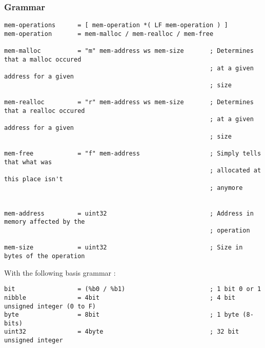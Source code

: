 \subsubsection{Grammar}
\begin{verbatim}
mem-operations      = [ mem-operation *( LF mem-operation ) ]
mem-operation       = mem-malloc / mem-realloc / mem-free

mem-malloc          = "m" mem-address ws mem-size       ; Determines that a malloc occured 
                                                        ; at a given address for a given 
                                                        ; size

mem-realloc         = "r" mem-address ws mem-size       ; Determines that a realloc occured
                                                        ; at a given address for a given 
                                                        ; size

mem-free            = "f" mem-address                   ; Simply tells that what was 
                                                        ; allocated at this place isn't 
                                                        ; anymore


mem-address         = uint32                            ; Address in memory affected by the
                                                        ; operation 

mem-size            = uint32                            ; Size in bytes of the operation
\end{verbatim}

With the following basis grammar : 
\begin{verbatim}
bit                 = (%b0 / %b1)                       ; 1 bit 0 or 1
nibble              = 4bit                              ; 4 bit unsigned integer (0 to F)
byte                = 8bit                              ; 1 byte (8-bits)
uint32              = 4byte                             ; 32 bit unsigned integer
\end{verbatim}
